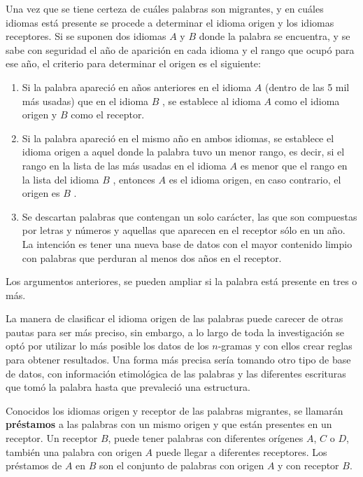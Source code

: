 Una vez que se tiene certeza de cuáles palabras son migrantes, y en cuáles
idiomas está presente se procede a determinar el idioma origen y los idiomas
receptores.   Si se suponen dos idiomas $\textit{A}$ y $\textit{B}$  donde la
palabra se encuentra, y se sabe con seguridad el año de aparición en cada
idioma y el rango que ocupó para ese año,  el criterio para determinar el
origen es el siguiente: 
\begin{enumerate}
\item  Si la palabra apareció en años anteriores en el idioma $\textit{A}$
(dentro de las 5 mil más usadas) que en el idioma $\textit{B}$ , se establece
al idioma $\textit{A}$  como el idioma origen y $\textit{B}$  como el receptor.
\item Si la palabra apareció en el mismo año en ambos idiomas, se establece el
idioma origen a aquel donde la palabra tuvo un menor rango, es decir, si el
rango en la lista de las más usadas en el idioma $\textit{A}$  es menor que el
rango en la lista del idioma $\textit{B}$ , entonces $\textit{A}$  es el idioma
origen, en caso contrario, el origen es $\textit{B}$ .
\item Se descartan palabras que contengan un solo carácter, las que son
compuestas por letras y números y aquellas que aparecen en el receptor sólo en un año. La intención es tener una  nueva base de datos con el mayor contenido
limpio con palabras que perduran al menos dos años en el receptor.

\end{enumerate}
Los argumentos anteriores, se pueden ampliar si la palabra está presente en tres o más.

La manera de clasificar el idioma origen de las palabras puede carecer de otras
pautas para ser más preciso, sin embargo, a lo largo de toda la investigación
se optó por utilizar lo más posible los datos de los $n$-gramas y  con ellos
crear reglas para obtener resultados.  Una forma más precisa sería tomando otro
tipo de base de datos, con información etimológica de las palabras y las
diferentes escrituras que tomó la palabra hasta que prevaleció una estructura.  

Conocidos los idiomas origen y receptor de las palabras migrantes, se llamarán
\textbf{préstamos} a las palabras con un mismo origen y que están  presentes en
un receptor.  Un receptor $\textit{B}$, puede tener palabras con diferentes
orígenes $\textit{A}$, $\textit{C}$ o $\textit{D}$, también una palabra con
origen $\textit{A}$ puede llegar a diferentes receptores.  Los préstamos de
$\textit{A}$  en $\textit{B}$  son el conjunto de palabras con origen
$\textit{A}$  y con receptor $\textit{B}$.     




